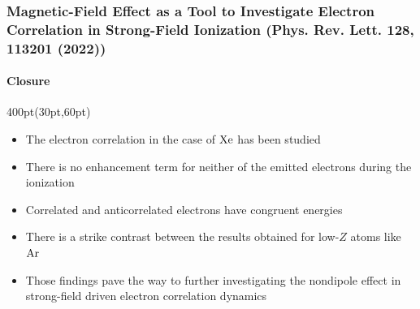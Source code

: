 \begin{frame}
\frametitle{Magnetic-Field Effect as a Tool to Investigate 
Electron Correlation in Strong-Field Ionization 
\small (Phys. Rev. Lett. 128, 113201 (2022))}
\framesubtitle{Closure}

\small
\begin{textblock*}{400pt}(30pt,60pt)
\begin{itemize}
\footnotesize
\item The electron correlation in the case of $\rm Xe$ has been studied
\item There is no enhancement term for neither of the emitted electrons
during the ionization
\item Correlated and anticorrelated electrons have congruent energies
\item There is a strike contrast between the results obtained for 
low-$Z$ atoms like $\rm Ar$

\vspace{20pt}

\item Those findings pave the way to further investigating 
the nondipole effect in strong-field driven electron correlation dynamics
\end{itemize}
\end{textblock*}



\end{frame}
